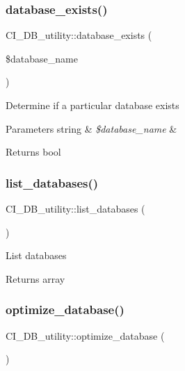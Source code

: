 \subsubsection{\texorpdfstring{database\+\_\+exists()}{database\_exists()}}
{\footnotesize\ttfamily C\+I\+\_\+\+D\+B\+\_\+utility\+::database\+\_\+exists (\begin{DoxyParamCaption}\item[{}]{\$database\+\_\+name }\end{DoxyParamCaption})}

Determine if a particular database exists


\begin{DoxyParams}[1]{Parameters}
string & {\em \$database\+\_\+name} & \\
\hline
\end{DoxyParams}
\begin{DoxyReturn}{Returns}
bool 
\end{DoxyReturn}
\mbox{\label{class_c_i___d_b__utility_a7071e8e5c8a4c6daa673a14a36007ef3}} 
\subsubsection{\texorpdfstring{list\+\_\+databases()}{list\_databases()}}
{\footnotesize\ttfamily C\+I\+\_\+\+D\+B\+\_\+utility\+::list\+\_\+databases (\begin{DoxyParamCaption}{ }\end{DoxyParamCaption})}

List databases

\begin{DoxyReturn}{Returns}
array 
\end{DoxyReturn}
\mbox{\label{class_c_i___d_b__utility_a15b368747604ffe404381f0fc501f27f}} 
\subsubsection{\texorpdfstring{optimize\+\_\+database()}{optimize\_database()}}
{\footnotesize\ttfamily C\+I\+\_\+\+D\+B\+\_\+utility\+::optimize\+\_\+database (\begin{DoxyParamCaption}{ }\end{DoxyParamCaption})}

